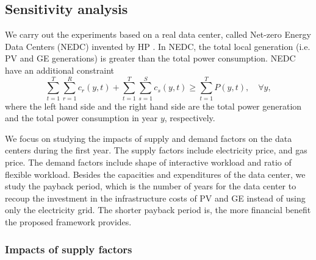 \subsection{Sensitivity analysis}
\label{sec:netzero_evaluation}

We carry out the experiments based on a real data center, called Net-zero Energy Data Centers (NEDC) invented by HP \cite{arlitt2012towards}. 
In NEDC, the total local generation (i.e. PV and GE generations) is greater than the total power consumption. NEDC have an additional constraint
$$\sum_{t=1}^{T}\sum_{r=1}^{R}c_{r}(y,t) + \sum_{t=1}^{T}\sum_{s=1}^{S}c_{s}(y,t) \geq \sum_{t=1}^{T}P(y,t), \quad \forall y,$$
where the left hand side and the right hand side are the total power generation and the total power consumption in year $y$, respectively.

We focus on studying the impacts of supply and demand factors on the data centers during the first year. The supply factors include electricity price, and gas price. The demand factors include shape of interactive workload and ratio of flexible workload. Besides the capacities and expenditures of the data center, we study the payback period, which is the number of years for the data center to recoup the investment in the infrastructure costs of PV and GE instead of using only the electricity grid. The shorter payback period is, the more financial benefit the proposed framework provides.

\subsubsection{Impacts of supply factors}

